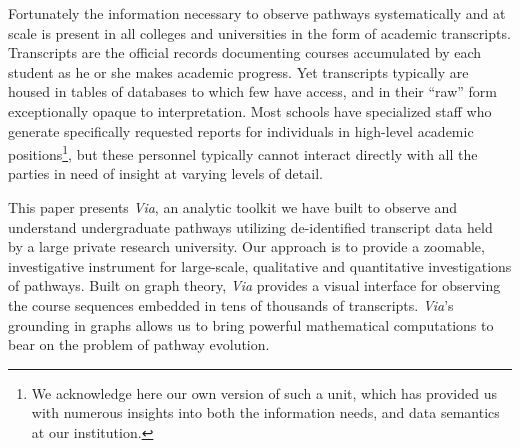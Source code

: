 

Fortunately the information necessary to observe pathways systematically and at scale is present in all colleges and universities in the form of academic transcripts. Transcripts are the official records documenting courses accumulated by each student as he or she makes academic progress. Yet transcripts typically are housed in tables of databases to which few have access, and in their ``raw'' form exceptionally opaque to interpretation. Most schools have specialized staff who generate specifically requested reports for individuals in high-level academic positions\footnote{We acknowledge
here our own version of such a unit, which has provided us with numerous insights into both the information needs, and data semantics at our institution.}, but these personnel typically cannot interact directly with all the parties in need of insight at varying levels of detail.


This paper presents {\it Via}, an analytic toolkit we have built to observe and understand undergraduate pathways utilizing de-identified transcript data held by a large private research university. Our approach is to provide a zoomable, investigative
instrument for large-scale, qualitative and quantitative
investigations of pathways. Built on graph theory, {\it Via} provides a
visual interface for observing the course sequences embedded in tens
of thousands of transcripts. {\it Via}'s grounding in graphs
allows us to bring powerful mathematical computations to bear on the problem of pathway evolution.

